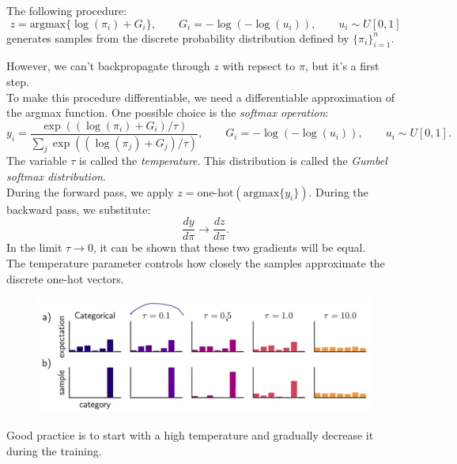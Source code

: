 \begin{frameprop}
The following procedure:
\begin{equation*}
z = \textrm{argmax}\{\log(\pi_i) + G_i\}, \qquad G_i = -\log(-\log(u_i)), \qquad u_i \sim U[0,1]
\end{equation*}
generates samples from the discrete probability distribution defined by $\{\pi_i\}_{i=1}^{n}$.
\end{frameprop}

However, we can't backpropagate through $z$ with repsect to $\pi$, but it's a first step.\\

To make this procedure differentiable, we need a differentiable approximation of the argmax function. One possible choice is the \textit{softmax operation}:
\begin{equation*}
y_i = \frac{\exp((\log(\pi_i) + G_i)/\tau)}{\sum_{j} \exp((\log(\pi_j) + G_j)/\tau)}, \qquad G_i = -\log(-\log(u_i)), \qquad u_i \sim U[0,1].
\end{equation*}
The variable $\tau$ is called the \textit{temperature}. This distribution is called the \textit{Gumbel softmax distribution}.\\

During the forward pass, we apply $z = \textrm{one-hot}(\textrm{argmax}\{y_i\})$. During the backward pass, we substitute:
\begin{equation*}
\frac{dy}{d\pi} \rightarrow \frac{dz}{d\pi}.
\end{equation*}
In the limit $\tau \rightarrow 0$, it can be shown that these two gradients will be equal.\\

The temperature parameter controls how closely the samples approximate the discrete one-hot vectors. 

\begin{figure}[H]
\centering
\includegraphics[scale=0.4]{gumbeltemperature.png}
\end{figure}

Good practice is to start with a high temperature and gradually decrease it during the training.




